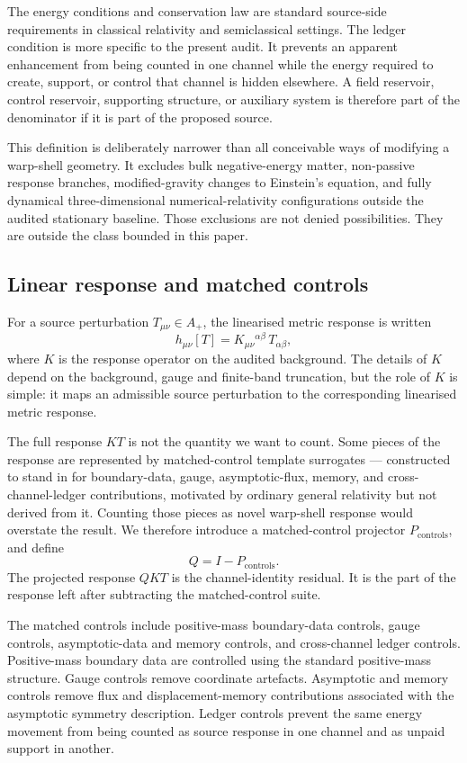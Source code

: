 \documentclass[11pt,a4paper]{article}
\begin{document}
The energy conditions and conservation law are standard source-side requirements in classical relativity and semiclassical settings. The ledger condition is more specific to the present audit. It prevents an apparent enhancement from being counted in one channel while the energy required to create, support, or control that channel is hidden elsewhere. A field reservoir, control reservoir, supporting structure, or auxiliary system is therefore part of the denominator if it is part of the proposed source.

This definition is deliberately narrower than all conceivable ways of modifying a warp-shell geometry. It excludes bulk negative-energy matter, non-passive response branches, modified-gravity changes to Einstein's equation, and fully dynamical three-dimensional numerical-relativity configurations outside the audited stationary baseline. Those exclusions are not denied possibilities. They are outside the class bounded in this paper.

\subsection{Linear response and matched controls}

For a source perturbation $T_{\mu\nu}\in A_{+}$, the linearised metric response is written
\[
h_{\mu\nu}[T] = K_{\mu\nu}{}^{\alpha\beta}\,T_{\alpha\beta},
\]
where $K$ is the response operator on the audited background. The details of $K$ depend on the background, gauge and finite-band truncation, but the role of $K$ is simple: it maps an admissible source perturbation to the corresponding linearised metric response.

The full response $KT$ is not the quantity we want to count. Some pieces of the response are represented by matched-control template surrogates --- constructed to stand in for boundary-data, gauge, asymptotic-flux, memory, and cross-channel-ledger contributions, motivated by ordinary general relativity but not derived from it. Counting those pieces as novel warp-shell response would overstate the result. We therefore introduce a matched-control projector $P_{\mathrm{controls}}$, and define
\[
Q=I-P_{\mathrm{controls}}.
\]
The projected response $QKT$ is the channel-identity residual. It is the part of the response left after subtracting the matched-control suite.

The matched controls include positive-mass boundary-data controls, gauge controls, asymptotic-data and memory controls, and cross-channel ledger controls. Positive-mass boundary data are controlled using the standard positive-mass structure. Gauge controls remove coordinate artefacts. Asymptotic and memory controls remove flux and displacement-memory contributions associated with the asymptotic symmetry description. Ledger controls prevent the same energy movement from being counted as source response in one channel and as unpaid support in another. \cite{SchoenYau1981,Witten1981,Strominger2014,WaldIyer1990}
\end{document}

